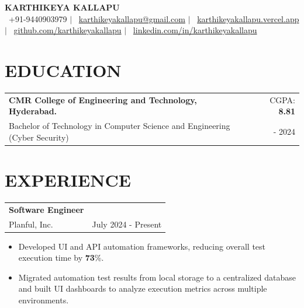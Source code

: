\documentclass[10pt, a4paper]{article}
\makeatletter
\newcommand{\resumeSubheading}[4]{%
  \vspace{0.6mm}%
  \begin{tabular*}{0.98\textwidth}[t]{l@{\extracolsep{\fill}}r}%
      \textbf{#1} & \footnotesize{#4} \\%
    \footnotesize{#3} & \fontsize{9}{10}\selectfont#2%
  \end{tabular*}%
  \vspace{-2.4mm}%
}
\makeatother
\begin{document}
\vspace*{-1.0cm}

\begin{center}
    {\fontsize{22}{24}\selectfont\textbf{KARTHIKEYA KALLAPU}} \\[4pt]
    \small
    \faPhone~+91-9440903979 \hspace{1pt} $|$
    \faEnvelope~\href{mailto:karthikeyakallapu@gmail.com}{karthikeyakallapu@gmail.com} \hspace{1pt} $|$
    \faGlobe~\href{https://karthikeyakallapu.vercel.app}{karthikeyakallapu.vercel.app} \hspace{1pt} $|$
    \faGithub~\href{https://github.com/karthikeyakallapu}{github.com/karthikeyakallapu} \hspace{1pt} $|$
    \faLinkedin~\href{https://linkedin.com/in/karthikeyakallapu}{linkedin.com/in/karthikeyakallapu}
    \\ \vspace{-3pt}
\end{center}

\vspace{0.2cm}

\section{\textbf{EDUCATION}}

\resumeSubheading
{CMR College of Engineering and Technology, Hyderabad.}{ 2020 - 2024 }
{Bachelor of Technology in Computer Science and Engineering (Cyber Security)}{CGPA: \textbf{8.81}}

\vspace{-3.0mm}

\section{\textbf{EXPERIENCE}}

\resumeSubheading
{Software Engineer}{ July 2024 - Present }{
  Planful, Inc.
}{}

\begin{itemize}[itemsep=-5pt]
  \item Developed UI and API automation frameworks, reducing overall test execution time by \textbf{73}\%.
  \item Migrated automation test results from local storage to a centralized database and built UI dashboards to analyze execution metrics across multiple environments.
\end{itemize}
\end{document}
